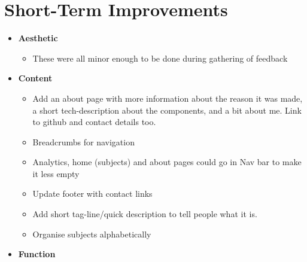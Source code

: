 \documentclass{article}
\begin{document}
\section*{Short-Term Improvements}
\begin{itemize}
    \item \textbf{Aesthetic}
    \begin{itemize}
        \item These were all minor enough to be done during gathering of feedback
    \end{itemize}
    \item \textbf{Content}
    \begin{itemize}
        \item  Add an about page with more information about the reason it was made, a short tech-description about the components, and a bit about me. Link to github and contact details too.
        \item Breadcrumbs for navigation
        \item Analytics, home (subjects) and about pages could go in Nav bar to make it less empty
        \item Update footer with contact links
        \item Add short tag-line/quick description to tell people what it is.
        \item Organise subjects alphabetically
    \end{itemize}
    \item \textbf{Function}
    \begin{itemize}
        

\end{itemize}
\end{itemize}
\end{document}

